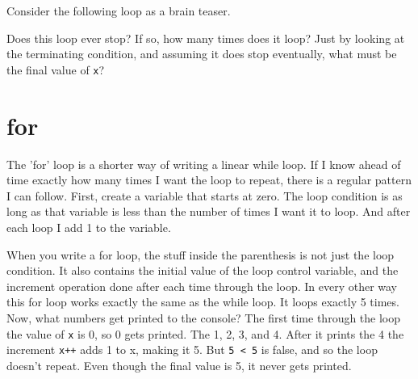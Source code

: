 Consider the following loop as a brain teaser.


Does this loop ever stop? If so, how many times does it loop? Just by looking at the terminating condition, and assuming it does stop eventually, what must be the final value of \texttt{x}?

\section{for}


The 'for' loop is a shorter way of writing a linear while loop. If I know ahead of time exactly how many times I want the loop to repeat, there is a regular pattern I can follow. First, create a variable that starts at zero. The loop condition is as long as that variable is less than the number of times I want it to loop. And after each loop I add 1 to the variable.


When you write a for loop, the stuff inside the parenthesis is not just the loop condition. It also contains the initial value of the loop control variable, and the increment operation done after each time through the loop. In every other way this for loop works exactly the same as the while loop. It loops exactly 5 times.\\

Now, what numbers get printed to the console? The first time through the loop the value of \texttt{x} is 0, so 0 gets printed. The 1, 2, 3, and 4. After it prints the 4 the increment \texttt{x++} adds 1 to x, making it 5. But \texttt{5 < 5} is false, and so the loop doesn't repeat. Even though the final value is 5, it never gets printed.